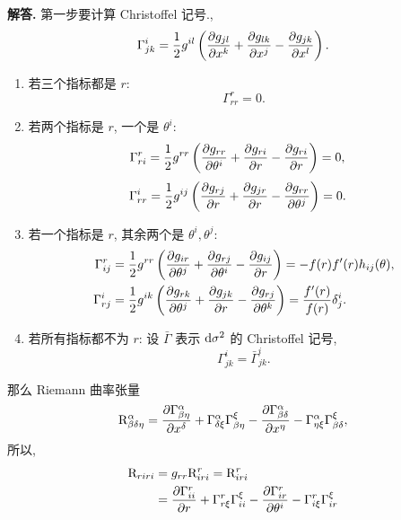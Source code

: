 \documentclass{ctexart}
\newenvironment{solution}{\par\noindent\textbf{解答. }}{\par}
\begin{document}
\begin{solution}
    第一步要计算 Christoffel 记号.,
    \[
        \Gamma^{i}_{jk} = \dfrac{1}{2}g^{il}\left(\dfrac{\partial g_{jl}}{\partial x^k} + \dfrac{\partial g_{lk}}{\partial x^j} - \dfrac{\partial g_{jk}}{\partial x^l}\right).
    \]
    \begin{enumerate}
        \item 若三个指标都是 $r$:
        \[
            \Gamma^{r}_{rr} = 0.
        \]
        \item 若两个指标是 $r$, 一个是 $\theta^i$:
        \[
            \begin{aligned}
                \Gamma^{r}_{r i} ={} & \dfrac{1}{2}g^{rr}\left(\dfrac{\partial g_{rr}}{\partial \theta^i} + \dfrac{\partial g_{ri}}{\partial r} - \dfrac{\partial g_{ri}}{\partial r}\right) = 0,
            \end{aligned}
        \]
        \[
            \begin{aligned}
                \Gamma^{i}_{rr} ={} & \dfrac{1}{2}g^{ij}\left(\dfrac{\partial g_{rj}}{\partial r} + \dfrac{\partial g_{jr}}{\partial r} - \dfrac{\partial g_{rr}}{\partial \theta^j}\right) = 0.
            \end{aligned}
        \]
        \item 若一个指标是 $r$, 其余两个是 $\theta^i, \theta^j$:
        \[
            \begin{aligned}
                \Gamma^{r}_{ij} ={} & \dfrac{1}{2}g^{rr}\left(\dfrac{\partial g_{ir}}{\partial \theta^j} + \dfrac{\partial g_{rj}}{\partial \theta^i} - \dfrac{\partial g_{ij}}{\partial r}\right) = -f(r) f^{\prime}(r) h_{ij}(\theta), \\
                \Gamma^{i}_{rj} ={} & \dfrac{1}{2}g^{ik}\left(\dfrac{\partial g_{rk}}{\partial \theta^j} + \dfrac{\partial g_{jk}}{\partial r} - \dfrac{\partial g_{rj}}{\partial \theta^k}\right) = \dfrac{f^{\prime}(r)}{f(r)} \delta^i_{j}.
            \end{aligned}
        \]
        \item 若所有指标都不为 $r$: 设 $\bar{\Gamma}$ 表示 $\mathop{}\!\mathrm{d} \sigma^2$ 的 Christoffel 记号,
        \[
            \Gamma^{i}_{jk} = \bar{\Gamma}^{i}_{jk}.
        \]
    \end{enumerate}
    那么 Riemann 曲率张量
    \[
        \mathrm{R}^{\alpha}_{\beta \delta \eta} = \dfrac{\partial \Gamma^{\alpha}_{\beta \eta}}{\partial x^\delta } + \Gamma^{\alpha}_{\delta \xi}\Gamma^{\xi}_{\beta \eta} - \dfrac{\partial \Gamma^{\alpha}_{\beta \delta }}{\partial x^\eta} - \Gamma^{\alpha}_{\eta \xi}\Gamma^{\xi}_{\beta \delta},
    \]
    所以,
    \[
        \begin{aligned}
            \R_{riri} ={} & g_{rr}\R^{r}_{iri} = \R^{r}_{i r i} \\
            ={} & \pdDif{\Gamma^{r}_{i i}}{r} + \Gamma^{r}_{r \xi}\Gamma^{\xi}_{i i} - \pdDif{\Gamma^{r}_{i r }}{\theta^i} - \Gamma^{r}_{i \xi}\Gamma^{\xi}_{i r} \\

\end{aligned}\]
\end{solution}
\end{document}
